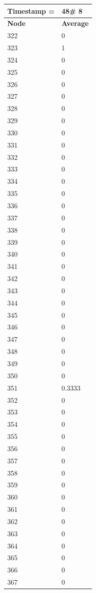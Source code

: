 \begin{tabular}{|l||l|}
\hline
\textbf{Timestamp =} & \textbf{48}\# 8\\\hline
	\textbf{Node} & \textbf{Average} \\ \hline
\hline
	322 & 0 \\ \hline
	323 & 1 \\ \hline
	324 & 0 \\ \hline
	325 & 0 \\ \hline
	326 & 0 \\ \hline
	327 & 0 \\ \hline
	328 & 0 \\ \hline
	329 & 0 \\ \hline
	330 & 0 \\ \hline
	331 & 0 \\ \hline
	332 & 0 \\ \hline
	333 & 0 \\ \hline
	334 & 0 \\ \hline
	335 & 0 \\ \hline
	336 & 0 \\ \hline
	337 & 0 \\ \hline
	338 & 0 \\ \hline
	339 & 0 \\ \hline
	340 & 0 \\ \hline
	341 & 0 \\ \hline
	342 & 0 \\ \hline
	343 & 0 \\ \hline
	344 & 0 \\ \hline
	345 & 0 \\ \hline
	346 & 0 \\ \hline
	347 & 0 \\ \hline
	348 & 0 \\ \hline
	349 & 0 \\ \hline
	350 & 0 \\ \hline
	351 & 0.3333 \\ \hline
	352 & 0 \\ \hline
	353 & 0 \\ \hline
	354 & 0 \\ \hline
	355 & 0 \\ \hline
	356 & 0 \\ \hline
	357 & 0 \\ \hline
	358 & 0 \\ \hline
	359 & 0 \\ \hline
	360 & 0 \\ \hline
	361 & 0 \\ \hline
	362 & 0 \\ \hline
	363 & 0 \\ \hline
	364 & 0 \\ \hline
	365 & 0 \\ \hline
	366 & 0 \\ \hline
	367 & 0 \\ \hline
\end{tabular}
